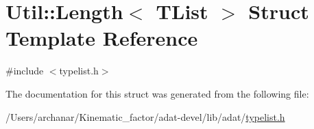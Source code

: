 \hypertarget{structUtil_1_1TL_1_1Length}{}\section{Util\+:\+:Length$<$ T\+List $>$ Struct Template Reference}
\label{structUtil_1_1TL_1_1Length}


{\ttfamily \#include $<$typelist.\+h$>$}



The documentation for this struct was generated from the following file\+:\begin{DoxyCompactItemize}
\item 
/\+Users/archanar/\+Kinematic\+\_\+factor/adat-\/devel/lib/adat/\mbox{\hyperlink{adat-devel_2lib_2adat_2typelist_8h}{typelist.\+h}}\end{DoxyCompactItemize}
